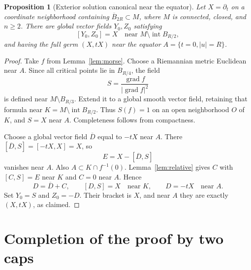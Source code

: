 \documentclass[11pt]{article}
\newtheorem{proposition}[theorem]{Proposition}
\theoremstyle{remark}
\begin{document}
\begin{proposition}[Exterior solution canonical near the equator]
\label{prop:exterior}
Let $X=\partial_t$ on a coordinate neighborhood containing $\overline B_{2R}\subset M$, where $M$ is connected, closed, and $n\ge2$. There are global vector fields $Y_0,Z_0$ satisfying
$$
 [Y_0,Z_0]=X\quad\text{near }M\setminus\operatorname{int}B_{R/2},
$$
and having the full germ $(X,tX)$ near the equator $A=\{t=0,|u|=R\}$.
\end{proposition}

\begin{proof}
Take $f$ from Lemma~\ref{lem:morse}. Choose a Riemannian metric Euclidean near $A$. Since all critical points lie in $B_{R/4}$, the field
$$
 S=\frac{\operatorname{grad}f}{|\operatorname{grad}f|^2}
$$
is defined near $M\setminus B_{R/3}$. Extend it to a global smooth vector field, retaining that formula near $K=M\setminus\operatorname{int}B_{R/2}$. Thus $S(f)=1$ on an open neighborhood $O$ of $K$, and $S=X$ near $A$. Completeness follows from compactness.

Choose a global vector field $\overline D$ equal to $-tX$ near $A$. There
$[\overline D,S]=[-tX,X]=X$, so
$$
 E=X-[\overline D,S]
$$
vanishes near $A$. Also $A\subset K\cap f^{-1}(0)$. Lemma~\ref{lem:relative} gives $C$ with $[C,S]=E$ near $K$ and $C=0$ near $A$. Hence
$$
 D=\overline D+C,\qquad [D,S]=X\quad\text{near }K,
 \qquad D=-tX\quad\text{near }A.
$$
Set $Y_0=S$ and $Z_0=-D$. Their bracket is $X$, and near $A$ they are exactly $(X,tX)$, as claimed.
\end{proof}

\section{Completion of the proof by two caps}\label{sec:completion}
\end{document}
